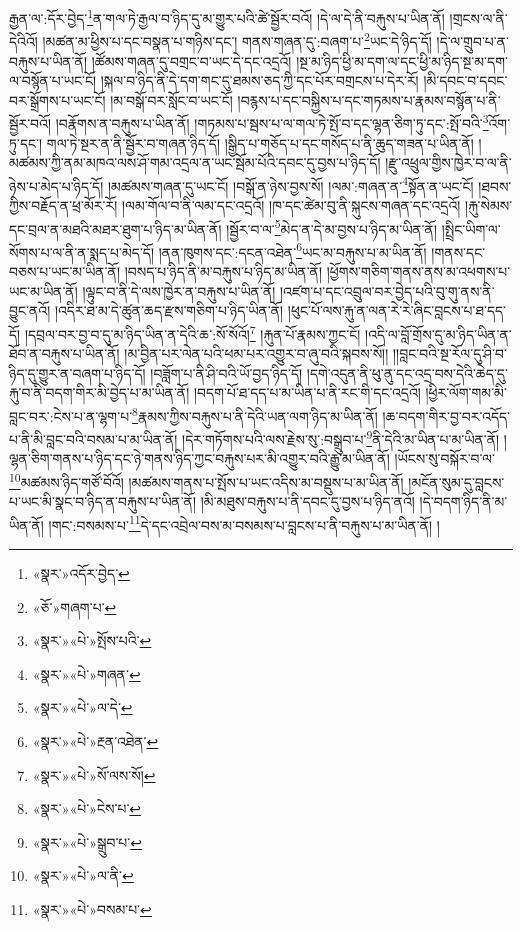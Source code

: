 རྒྱན་ལ་:དོར་བྱེད་\footnote{«སྣར་»འདོར་བྱེད་}ན་གལ་ཏེ་རྒྱལ་བ་ཉིད་དུ་མ་གྱུར་པའི་ཚེ་སྦྱོར་བའོ། །དེ་ལ་དེ་ནི་བརྐུས་པ་ཡིན་ནོ། །གྲངས་ལ་ནི་དེའིའོ། །མཚན་མ་ཕྱིས་པ་དང་བསྣན་པ་གཉིས་དང་། གནས་གཞན་དུ་:བཞག་པ་\footnote{«ཅོ་»གཞག་པ་}ཡང་དེ་ཉིད་དོ། །དེ་ལ་གྲུབ་པ་ན་བརྐུས་པ་ཡིན་ནོ། །ཚོམས་གཞན་དུ་བགྲང་བ་ཡང་དེ་དང་འདྲའོ། །སྔ་མ་ཉིད་ཕྱི་མ་དག་ལ་དང་ཕྱི་མ་ཉིད་སྔ་མ་དག་ལ་བསྙོན་པ་ཡང་ངོ། །སྐལ་བ་ཉིད་ནི་དེ་དག་གང་དུ་ཐམས་ཅད་ཀྱི་དང་པོར་བགྲངས་པ་དེར་རོ། །མི་དབང་བ་དབང་བར་སྒྲོགས་པ་ཡང་ངོ། །མ་བསྒོ་བར་སློང་བ་ཡང་ངོ། །བརྙས་པ་དང་བསྐྱིས་པ་དང་གཏམས་པ་རྣམས་བསྙོན་པ་ནི་སྦྱོར་བའོ། །བརྣོགས་ན་བརྐུས་པ་ཡིན་ནོ། །གཏམས་པ་སྦས་པ་ལ་གལ་ཏེ་སྤོ་བ་དང་ལྷན་ཅིག་ཏུ་དང་:སྤོ་བའི་\footnote{«སྣར་»«པེ་»སྤོས་པའི་}འོག་ཏུ་དང་། གལ་ཏེ་སྔར་ན་ནི་སྦྱོར་བ་གཞན་ཉིད་དོ། །སྒྱིད་པ་གཅོད་པ་དང་གསོད་པ་ནི་ཆུད་གཟན་པ་ཡིན་ནོ། །མཚམས་ཀྱི་ནམ་མཁའ་ལས་ཤོ་གམ་འདྲལ་ན་ཡང་སྦོམ་པོའི་དབང་དུ་བྱས་པ་ཉིད་དོ། །རྫུ་འཕྲུལ་གྱིས་ཁྱེར་བ་ལ་ནི་ཉེས་པ་མེད་པ་ཉིད་དོ། །མཚམས་གཞན་དུ་ཡང་ངོ། །བསྒོ་ན་ཉེས་བྱས་སོ། །ལམ་:གཞན་ན་\footnote{«སྣར་»«པེ་»གཞན་}སྟོན་ན་ཡང་ངོ། །ཐབས་ཀྱིས་བརྗོད་ན་ཕྲ་མོར་རོ། །ལམ་གོལ་བ་ནི་ལམ་དང་འདྲའོ། །ཁ་དང་ཚེམ་བུ་ནི་སྐུངས་གཞན་དང་འདྲའོ། །རྐུ་སེམས་དང་བྲལ་ན་མཐའི་མཐར་ཐུག་པ་ཉིད་མ་ཡིན་ནོ། །སྦྱོར་བ་ལ་\footnote{«སྣར་»«པེ་»ལ་དེ་}མེད་ན་དེ་མ་བྱས་པ་ཉིད་མ་ཡིན་ནོ། །སྤྲིང་ཡིག་ལ་སོགས་པ་ལ་ནི་ན་སྨད་པ་མེད་དོ། །ནན་ཁུགས་དང་:དངན་འཐེན་\footnote{«སྣར་»«པེ་»རྔན་འཐེན་}ཡང་མ་བརྐུས་པ་མ་ཡིན་ནོ། །གནས་དང་བཅས་པ་ཡང་མ་ཡིན་ནོ། །བསད་པ་ཉིད་ནི་མ་བརྐུས་པ་ཉིད་མ་ཡིན་ནོ། །ཕྱོགས་གཅིག་གནས་ནས་མ་འཕགས་པ་ཡང་མ་ཡིན་ནོ། །ལྟུང་བ་ནི་དེ་ལས་ཁྱེར་ན་བརྐུས་པ་ཡིན་ནོ། །འཛག་པ་དང་འབྲུལ་བར་བྱེད་པའི་བུ་གུ་ནས་ནི་བྱུང་ནའོ། །འདིར་ཐ་མ་དེ་ཚུན་ཆད་རྫས་གཅིག་པ་ཉིད་ཡིན་ནོ། །ཕུང་པོ་ལས་རྐུ་ན་ལན་རེ་རེ་ཞིང་བླངས་པ་ཐ་དད་དོ། །དབྲལ་བར་བྱ་བ་དུ་མ་ཉིད་ཡིན་ན་དེའི་ཆ་:སོ་སོའོ།\footnote{«སྣར་»«པེ་»སོ་ལས་སོ།} །རྐུན་པོ་རྣམས་ཀྱང་ངོ། །འདི་ལ་བློ་གྲོས་དུ་མ་ཉིད་ཡིན་ན་ཐོབ་ན་བརྐུས་པ་ཡིན་ནོ། །མ་བྱིན་པར་ལེན་པའི་ཕམ་པར་འགྱུར་བ་ཞུ་བའི་སྐབས་སོ།། །།བླང་བའི་སྔ་རོལ་དུ་ཤི་བ་ཉིད་དུ་གྱུར་ན་བཞག་པ་ཉིད་དོ། །བཟློག་པ་ནི་ཤི་བའི་ཡོ་བྱད་ཉིད་དོ། །དགེ་འདུན་ནི་ཕུ་ནུ་དང་འདྲ་བས་དེའི་ཆེད་དུ་རྐུ་བ་ནི་བདག་གིར་མི་བྱེད་པ་མ་ཡིན་ནོ། །བདག་པོ་ཐ་དད་པ་མ་ཡིན་པ་ནི་རང་གི་དང་འདྲའོ། །ཕྱིར་ལོག་གམ་མི་བླང་བར་:ངེས་པ་ན་ལྷག་པ་\footnote{«སྣར་»«པེ་»ངེས་པ་}རྣམས་ཀྱིས་བརྐུས་པ་ནི་དེའི་ཡན་ལག་ཉིད་མ་ཡིན་ནོ། །ཆ་བདག་གིར་བྱ་བར་འདོད་པ་ནི་མི་བླང་བའི་བསམ་པ་མ་ཡིན་ནོ། །དེར་གཏོགས་པའི་ལས་རྗེས་སུ་:བསྒྲུབ་པ་\footnote{«སྣར་»«པེ་»སྒྲུབ་པ་}ནི་དེའི་མ་ཡིན་པ་མ་ཡིན་ནོ། །ལྷན་ཅིག་གནས་པ་ཉིད་དང་ཉེ་གནས་ཉིད་ཀྱང་བརྐུས་པར་མི་འགྱུར་བའི་རྒྱུ་མ་ཡིན་ནོ། །ཡོངས་སུ་བསྐོར་བ་ལ་\footnote{«སྣར་»«པེ་»ལ་ནི་}མཚམས་ཉིད་གཙོ་བོའོ། །མཚམས་གནས་པ་སྤོས་པ་ཡང་འདིས་མ་བསྡུས་པ་མ་ཡིན་ནོ། །མངོན་སུམ་དུ་བླངས་པ་ཡང་མི་སྣང་བ་ཉིད་ན་བརྐུས་པ་ཡིན་ནོ། །མི་མཐུས་བརྐུས་པ་ནི་དབང་དུ་བྱས་པ་ཉིད་ནའོ། །དེ་བདག་ཉིད་ནི་མ་ཡིན་ནོ། །གང་:བསམས་པ་\footnote{«སྣར་»«པེ་»བསམ་པ་}དེ་དང་འབྲེལ་བས་མ་བསམས་པ་བླངས་པ་ནི་བརྐུས་པ་མ་ཡིན་ནོ། །
